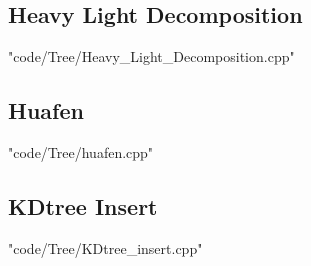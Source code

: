 \documentclass [landscape,8pt,a4paper,twocolumn]{article}
\begin{document}
\subsection{Heavy Light Decomposition}
 {"code/Tree/Heavy_Light_Decomposition.cpp"}
\subsection{Huafen}
 {"code/Tree/huafen.cpp"}
\subsection{KDtree Insert}
 {"code/Tree/KDtree_insert.cpp"}
\end{document}

